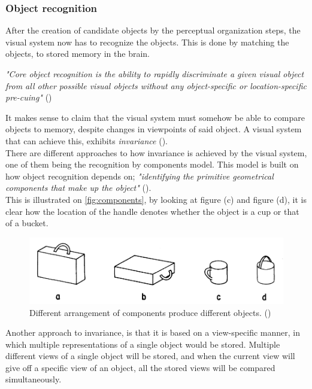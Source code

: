 \documentclass{article}
\newcommand{\goodcite}[1]{ {(\cite{#1})}}
\begin{document}
\subsubsection{Object recognition}
After the creation of candidate objects by the perceptual organization steps, the visual system now has to recognize the objects. This is done by matching the objects, to stored memory in the brain.\\

\begin{center} %
\textit{"Core object recognition is the ability to rapidly discriminate a given visual object from all other possible visual objects without any object-specific or location-specific pre-cuing"}\goodcite{solveVisual}\\
\end{center}

It makes sense to claim that the visual system must somehow be able to compare objects to memory, despite changes in viewpoints of said object. A visual system that can achieve this, exhibits \textit{invariance}\goodcite{hsp}.\\There are different approaches to how invariance is achieved by the visual system, one of them being the recognition by components model. This model is built on how object recognition depends on; \textit{"identifying the primitive geometrical components that make up the object"}\goodcite{hsp}.\\This is illustrated on \autoref{fig:components}, by looking at figure (c) and figure (d), it is clear how the location of the handle denotes whether the object is a cup or that of a bucket.

\begin{figure}[H]
    \centering
    \includegraphics[width=\textwidth]{img/comps.png}
    \caption{Different arrangement of components produce different objects.\goodcite{bieder}}
    \label{fig:components}
\end{figure}

Another approach to invariance, is that it is based on a view-specific manner, in which multiple representations of a single object would be stored. Multiple different views of a single object will be stored, and when the current view will give off a specific view of an object, all the stored views will be compared simultaneously.\medskip \\ %
\end{document}
